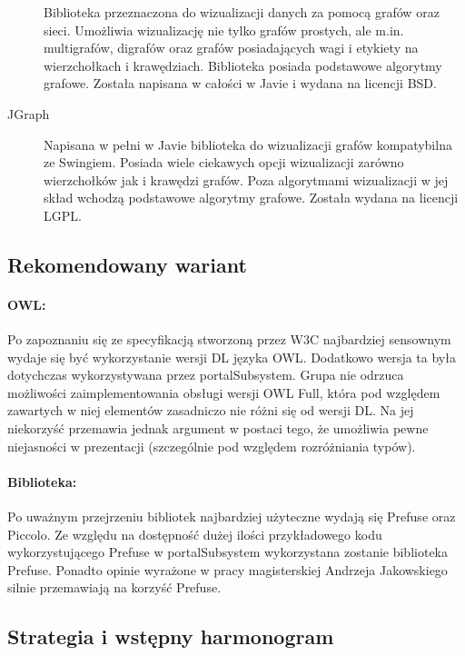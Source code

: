 \begin{description}
 Biblioteka przeznaczona do wizualizacji danych za pomocą grafów oraz sieci. Umożliwia wizualizację nie tylko grafów prostych, ale m.in. multigrafów, digrafów oraz grafów posiadających wagi i etykiety na wierzchołkach i krawędziach. Biblioteka posiada podstawowe algorytmy grafowe. Została napisana w całości w Javie i wydana na licencji BSD.
\item[JGraph]

 Napisana w pełni w Javie biblioteka do wizualizacji grafów kompatybilna ze Swingiem. Posiada wiele ciekawych opcji wizualizacji zarówno wierzchołków jak i krawędzi grafów. Poza algorytmami wizualizacji w jej skład wchodzą podstawowe algorytmy grafowe. Została wydana na licencji LGPL.
\end{description}



\subsection{Rekomendowany wariant}


\paragraph{OWL:} 
 Po zapoznaniu się ze specyfikacją stworzoną przez W3C najbardziej sensownym wydaje się być wykorzystanie wersji DL języka OWL. Dodatkowo wersja ta była dotychczas wykorzystywana przez portalSubsystem. Grupa nie odrzuca możliwości zaimplementowania obsługi wersji OWL Full, która pod względem zawartych w niej elementów zasadniczo nie różni się od wersji DL. Na jej niekorzyść przemawia jednak argument w postaci tego, że umożliwia pewne niejasności w prezentacji (szczególnie pod względem rozróżniania typów).

\paragraph{Biblioteka:}

Po uważnym przejrzeniu bibliotek najbardziej użyteczne wydają się Prefuse oraz Piccolo. Ze względu na dostępność dużej ilości przykładowego kodu wykorzystującego Prefuse w portalSubsystem wykorzystana zostanie biblioteka Prefuse. Ponadto opinie wyrażone w pracy magisterskiej Andrzeja Jakowskiego silnie przemawiają na korzyść Prefuse.


\subsection{Strategia i wstępny harmonogram}

